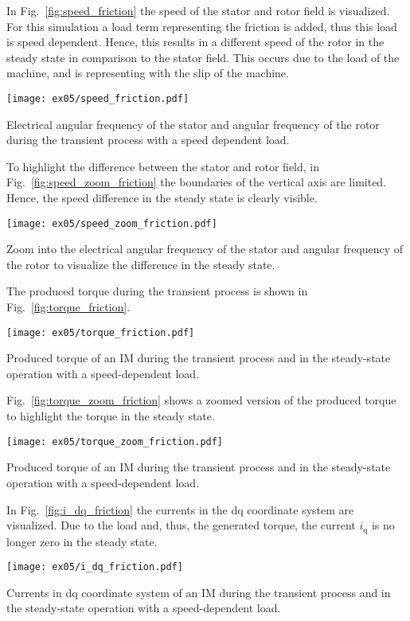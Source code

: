 \begin{solutionblock}
    In Fig.~\ref{fig:speed_friction} the speed of the stator and rotor field is visualized. For this simulation a load term representing the friction is added, thus this load is speed dependent. Hence, this results in a different speed of the rotor in the steady state in comparison to the stator field. This occurs due to the load of the machine, and is representing with the slip of the machine.
    \begin{solutionfigure}
        \centering
        \texttt{[image: ex05/speed\_friction.pdf]}
        \caption{Electrical angular frequency of the stator and angular frequency of the rotor during the transient process with a speed dependent load.}
        \label{fig:speed_friction}
    \end{solutionfigure}
    
    To highlight the difference between the stator and rotor field, in Fig.~\ref{fig:speed_zoom_friction} the boundaries of the vertical axis are limited. Hence, the speed difference in the steady state is clearly visible.
    \begin{solutionfigure}
        \centering
        \texttt{[image: ex05/speed\_zoom\_friction.pdf]}
        \caption{Zoom into the electrical angular frequency of the stator and angular frequency of the rotor to visualize the difference in the steady state.}
        \label{fig:speed_zoom_friction}
    \end{solutionfigure}

    The produced torque during the transient process is shown in Fig.~\ref{fig:torque_friction}.
    \begin{solutionfigure}
        \centering
        \texttt{[image: ex05/torque\_friction.pdf]}
        \caption{Produced torque of an IM during the transient process and in the steady-state operation with a speed-dependent load.}
        \label{fig:torque_friction}
    \end{solutionfigure}
    Fig.~\ref{fig:torque_zoom_friction} shows a zoomed version of the produced torque to highlight the torque in the steady state.
    \begin{solutionfigure}
        \centering
        \texttt{[image: ex05/torque\_zoom\_friction.pdf]}
        \caption{Produced torque of an IM during the transient process and in the steady-state operation with a speed-dependent load.}
        \label{fig:torque_zoom_friction}
    \end{solutionfigure}

    In Fig.~\ref{fig:i_dq_friction} the currents in the dq coordinate system are visualized. Due to the load and, thus, the generated torque, the current $i_{\mathrm{q}}$ is no longer zero in the steady state. 
    \begin{solutionfigure}
        \centering
        \texttt{[image: ex05/i\_dq\_friction.pdf]}
        \caption{Currents in dq coordinate system of an IM during the transient process and in the steady-state operation with a speed-dependent load.}
        \label{fig:i_dq_friction}
    \end{solutionfigure}


\end{solutionblock}
